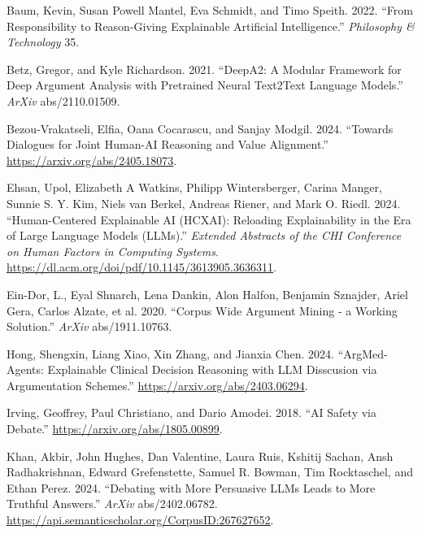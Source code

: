 \documentclass[
  letterpaper,
  DIV=11,
  numbers=noendperiod]{scrartcl}
\newlength{\cslhangindent}
\newlength{\cslentryspacingunit} %
\newenvironment{CSLReferences}[2] %
 {%
  \setlength{\parindent}{0pt}
  \ifodd #1
  \let\oldpar\par
  \def\par{\hangindent=\cslhangindent\oldpar}
  \fi
  \setlength{\parskip}{#2\cslentryspacingunit}
 }%
 {}
\begin{document}
\hypertarget{refs}{}
\begin{CSLReferences}{1}{0}
\leavevmode{}%
Baum, Kevin, Susan Powell Mantel, Eva Schmidt, and Timo Speith. 2022.
{``From Responsibility to Reason-Giving Explainable Artificial
Intelligence.''} \emph{Philosophy \& Technology} 35.

\leavevmode{}%
Betz, Gregor, and Kyle Richardson. 2021. {``DeepA2: A Modular Framework
for Deep Argument Analysis with Pretrained Neural Text2Text Language
Models.''} \emph{ArXiv} abs/2110.01509.

\leavevmode{}%
Bezou-Vrakatseli, Elfia, Oana Cocarascu, and Sanjay Modgil. 2024.
{``Towards Dialogues for Joint Human-AI Reasoning and Value
Alignment.''} \url{https://arxiv.org/abs/2405.18073}.

\leavevmode{}%
Ehsan, Upol, Elizabeth A Watkins, Philipp Wintersberger, Carina Manger,
Sunnie S. Y. Kim, Niels van Berkel, Andreas Riener, and Mark O. Riedl.
2024. {``Human-Centered Explainable AI (HCXAI): Reloading Explainability
in the Era of Large Language Models (LLMs).''} \emph{Extended Abstracts
of the CHI Conference on Human Factors in Computing Systems}.
\url{https://dl.acm.org/doi/pdf/10.1145/3613905.3636311}.

\leavevmode{}%
Ein-Dor, L., Eyal Shnarch, Lena Dankin, Alon Halfon, Benjamin Sznajder,
Ariel Gera, Carlos Alzate, et al. 2020. {``Corpus Wide Argument Mining -
a Working Solution.''} \emph{ArXiv} abs/1911.10763.

\leavevmode{}%
Hong, Shengxin, Liang Xiao, Xin Zhang, and Jianxia Chen. 2024.
{``ArgMed-Agents: Explainable Clinical Decision Reasoning with LLM
Disscusion via Argumentation Schemes.''}
\url{https://arxiv.org/abs/2403.06294}.

\leavevmode{}%
Irving, Geoffrey, Paul Christiano, and Dario Amodei. 2018. {``AI Safety
via Debate.''} \url{https://arxiv.org/abs/1805.00899}.

\leavevmode{}%
Khan, Akbir, John Hughes, Dan Valentine, Laura Ruis, Kshitij Sachan,
Ansh Radhakrishnan, Edward Grefenstette, Samuel R. Bowman, Tim
Rocktaschel, and Ethan Perez. 2024. {``Debating with More Persuasive
LLMs Leads to More Truthful Answers.''} \emph{ArXiv} abs/2402.06782.
\url{https://api.semanticscholar.org/CorpusID:267627652}.


\end{CSLReferences}
\end{document}

